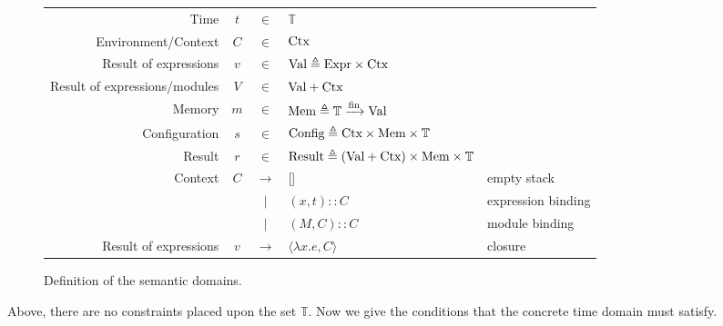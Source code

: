 \documentclass[acmsmall,screen,review]{acmart}
\theoremstyle{definition}
\newcommand*{\vbar}{|}
\newcommand*{\cons}{::}
\newcommand*{\Expr}{\text{Expr}}
\newcommand*{\Time}{\mathbb{T}}
\newcommand*{\Ctx}[1]{\text{Ctx}\vphantom{#1}}
\newcommand*{\Value}[1]{\text{Val}\vphantom{#1}}
\newcommand*{\Mem}[1]{\text{Mem}\vphantom{#1}}
\newcommand*{\mem}{m}
\newcommand*{\Config}[1]{\text{Config}\vphantom{#1}}
\newcommand*{\Result}[1]{\text{Result}\vphantom{#1}}
\newcommand*{\fin}[2]{{#1}\xrightarrow{\text{fin}}{#2}}
\begin{document}
\begin{figure}[htb]
  \centering
  \footnotesize
  \begin{tabular}{rccll}
    Time                          & $t$    & $\in$         & $\Time$                                                                                                  \\
    Environment/Context           & $C$    & $\in$         & $\Ctx\Time$                                                                                              \\
    Result of expressions         & $v$    & $\in$         & $\Value\Time \triangleq \Expr\times\Ctx\Time$                                                            \\
    Result of expressions/modules & $V$    & $\in$         & $\Value{\Time}+\Ctx{\Time}$                                                                              \\
    Memory                        & $\mem$ & $\in$         & $\Mem{\Time} \triangleq \fin{\Time}{\Value{\Time}}$                                                      \\
    Configuration                 & $s$    & $\in$         & $\Config{\Time} \triangleq \Ctx{\Time}\times\Mem{\Time}\times\Time$                                      \\
    Result                        & $r$    & $\in$         & $\Result{\Time} \triangleq (\Value{\Time}+\Ctx{\Time})\times\Mem{\Time}\times\Time$                      \\
    Context                       & $C$    & $\rightarrow$ & []                                                                                  & empty stack        \\
                                  &        & $\vbar$       & $(x,t)\cons C$                                                                      & expression binding \\
                                  &        & $\vbar$       & $(M,C)\cons C$                                                                      & module binding     \\
    Result of expressions         & $v$    & $\rightarrow$ & $\langle \lambda x.e, C \rangle$                                                    & closure
  \end{tabular}
  \caption{Definition of the semantic domains.}
\end{figure}

Above, there are no constraints placed upon the set $\Time$.
Now we give the conditions that the concrete time domain must satisfy.
\end{document}
